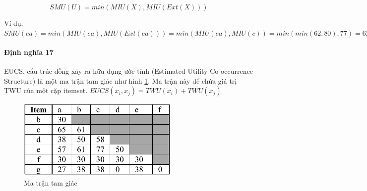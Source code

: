 $$ SMU(U) = min(MIU(X), MIU(Ext(X))) $$

Ví dụ, $SMU(ea) = min(MIU(ea), MIU(Ext(ea))) = min (MIU(ea), MIU(c)) = min(min(62, 80), 77) = 62$

\paragraph{Định nghĩa 17} EUCS, cấu trúc đồng xảy ra hữu dụng ước tính (Estimated Utility Co-occurrence Structure) \cite{fournier2014fhm} là một ma trận tam giác như hình \ref{fig:eucs}. Ma trận này để chứa giá trị TWU của một cặp itemset. $EUCS(x_i, x_j) = TWU(x_i) + TWU(x_j)$

\begin{figure}[h]
\centering
\includegraphics[width=0.7\textwidth]{image/fig/trianglematrix.PNG}
\caption{\label{fig:eucs} Ma trận tam giác  }
\end{figure}